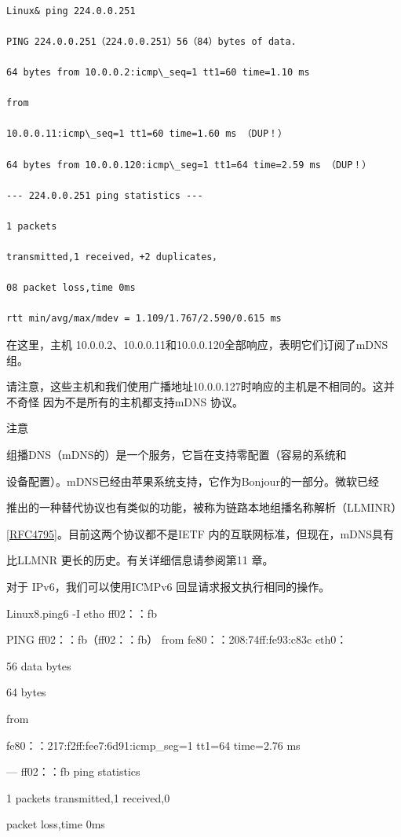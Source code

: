 \begin{verbatim}
    
Linux& ping 224.0.0.251

PING 224.0.0.251（224.0.0.251）56（84）bytes of data.

64 bytes from 10.0.0.2:icmp\_seq=1 tt1=60 time=1.10 ms

from

10.0.0.11:icmp\_seq=1 tt1=60 time=1.60 ms （DUP！）

64 bytes from 10.0.0.120:icmp\_seg=1 tt1=64 time=2.59 ms （DUP！）

--- 224.0.0.251 ping statistics ---

1 packets

transmitted,1 received，+2 duplicates，

08 packet loss,time 0ms

rtt min/avg/max/mdev = 1.109/1.767/2.590/0.615 ms
\end{verbatim}

在这里，主机 10.0.0.2、10.0.0.11和10.0.0.120全部响应，表明它们订阅了mDNS组。

请注意，这些主机和我们使用广播地址10.0.0.127时响应的主机是不相同的。这并不奇怪
因为不是所有的主机都支持mDNS 协议。

注意

组播DNS（mDNS的）是一个服务，它旨在支持零配置（容易的系统和

设备配置）。mDNS已经由苹果系统支持，它作为Bonjour的一部分。微软已经

推出的一种替代协议也有类似的功能，被称为链路本地组播名称解析（LLMINR）

\href{https://www.rfc-editor.org/rfc/rfc4795}{[RFC4795]}。目前这两个协议都不是IETF 内的互联网标准，但现在，mDNS具有

比LLMNR 更长的历史。有关详细信息请参阅第11 章。

对于 IPv6，我们可以使用ICMPv6 回显请求报文执行相同的操作。

Linux8.ping6 -I etho ff02：：fb

PING ff02：：fb（ff02：：fb） from fe80：：208:74ff:fe93:c83c eth0：

56 data bytes

64 bytes

from

fe80：：217:f2ff:fee7:6d91:icmp\_seg=1 tt1=64 time=2.76 ms

--- ff02：：fb ping statistics

1 packets transmitted,1 received,0%

packet loss,time 0ms

